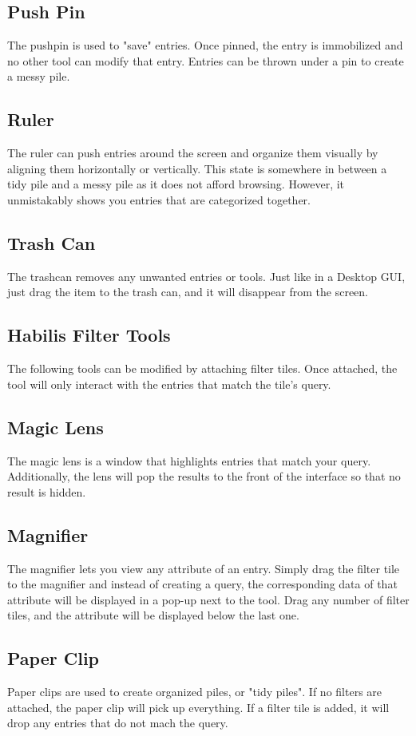 \documentclass{article}
\begin{document}
\subsection*{Push Pin}
The pushpin is used to "save" entries.  Once pinned, the entry is immobilized and no other tool can modify that entry.  Entries can be thrown under a pin to create a messy pile.  
\subsection*{Ruler}
The ruler can push entries around the screen and organize them visually by aligning them horizontally or vertically.  This state is somewhere in between a tidy pile and a messy pile as it does not afford browsing.  However, it unmistakably shows you entries that are categorized together.  
\subsection*{Trash Can}
The trashcan removes any unwanted entries or tools.  Just like in a Desktop GUI, just drag the item to the trash can, and it will disappear from the screen.  
\subsection{Habilis Filter Tools}
The following tools can be modified by attaching filter tiles.  Once attached, the tool will only interact with the entries that match the tile's query.  
\subsection*{Magic Lens}
The magic lens is a window that highlights entries that match your query.  Additionally, the lens will pop the results to the front of the interface so that no result is hidden.  
\subsection*{Magnifier}
The magnifier lets you view any attribute of an entry.  Simply drag the filter tile to the magnifier and instead of creating a query, the corresponding data of that attribute will be displayed in a pop-up next to the tool.  Drag any number of filter tiles, and the attribute will be displayed below the last one.  
\subsection*{Paper Clip}
Paper clips are used to create organized piles, or "tidy piles".  If no filters are attached, the paper clip will pick up everything.  If a filter tile is added, it will drop any entries that do not mach the query.  
\end{document}

